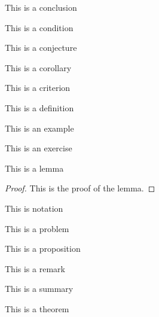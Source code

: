 \begin{conclusion}
This is a conclusion
\end{conclusion}

\begin{condition}
This is a condition
\end{condition}

\begin{conjecture}
This is a conjecture
\end{conjecture}

\begin{corollary}
This is a corollary
\end{corollary}

\begin{criterion}
This is a criterion
\end{criterion}

\begin{definition}
This is a definition
\end{definition}

\begin{example}
This is an example
\end{example}

\begin{exercise}
This is an exercise
\end{exercise}

\begin{lemma}
This is a lemma
\end{lemma}

\begin{proof}
This is the proof of the lemma.
\end{proof}

\begin{notation}
This is notation
\end{notation}

\begin{problem}
This is a problem
\end{problem}

\begin{proposition}
This is a proposition
\end{proposition}

\begin{remark}
This is a remark
\end{remark}

\begin{summary}
This is a summary
\end{summary}

\begin{theorem}
This is a theorem
\end{theorem}

